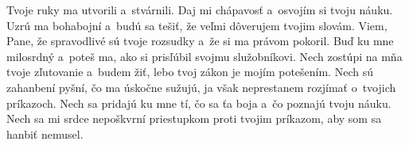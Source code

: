 Tvoje ruky ma utvorili a~stvárnili.
Daj mi chápavosť a~osvojím si tvoju náuku.
\versseparator
Uzrú ma bohabojní a~budú sa tešiť,
že veľmi dôverujem tvojim slovám.
\versseparator
Viem, Pane, že spravodlivé sú tvoje rozsudky
a~že si ma právom pokoril.
\versseparator
Buď ku mne milosrdný a~poteš ma,
ako si prisľúbil svojmu služobníkovi.
\versseparator
Nech zostúpi na mňa tvoje zľutovanie a~budem žiť,
lebo tvoj zákon je mojím potešením.
\versseparator
Nech sú zahanbení pyšní, čo ma úskočne sužujú,
ja však neprestanem rozjímať o~tvojich príkazoch.
\versseparator
Nech sa pridajú ku mne tí, čo sa ťa boja
a~čo poznajú tvoju náuku.
\versseparator
Nech sa mi srdce nepoškvrní priestupkom proti tvojim príkazom,
aby som sa hanbiť nemusel.